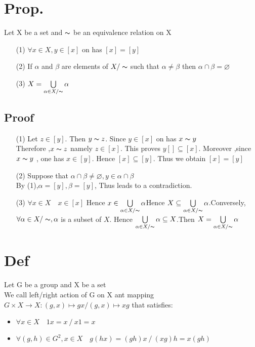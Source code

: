 \documentclass{book}
\begin{document}
\section{Prop.}
Let X be a set and $\thicksim$  be an equivalence relation on X
\begin{itemize}
    \item[(1)] $\forall x\in X,y\in [x]$ on has $[x]=[y]$
    \item[(2)] If $\alpha$ and $\beta$ are elements of $X/\thicksim $ such that $\alpha\not=\beta$ then $\alpha\cap\beta =\varnothing$
    \item[(3)] $X=\bigcup\limits_{\alpha\in X/\thicksim }\alpha$
\end{itemize}
\subsection{Proof}
\begin{itemize}
    \item[(1)] Let $z\in [y]$. Then $y\thicksim z$. Since $y\in [x]$ on has $x\thicksim y$\\Therefore ,$x\thicksim z$ namely $z\in [x]$. This proves $y[]\subseteq [x]$. Moreover ,since $x\thicksim y$ , one has $x\in [y]$. Hence $[x]\subseteq[y]$. Thus we obtain $[x]=[y]$
    \item[(2)] Suppose that $\alpha\cap\beta\not=\varnothing,y\in \alpha\cap\beta$\\By (1),$\alpha=[y],\beta=[y]$, Thus leads to a contradiction.
    \item[(3)] $\forall x\in X\quad x\in [x]$ Hence $x\in \bigcup\limits_{\alpha\in X/\thicksim }\alpha$Hence $X\subseteq\bigcup\limits_{\alpha\in X/\thicksim }\alpha$.Conversely, $\forall \alpha\in X/\thicksim ,\alpha$ is a subset of $X$. Hence $\bigcup\limits_{\alpha\in X/\thicksim }\alpha\subseteq X$.Then $X=\bigcup\limits_{\alpha\in X/\thicksim }\alpha$
\end{itemize}
\section{Def}
Let G be a group and X be a set \\
We call left/right action of G on X ant mapping $G\times X\rightarrow X:(g,x)\mapsto gx/(g,x)\mapsto xg$ that satisfies:
\begin{itemize}
    \item $\forall x\in X\quad 1x=x\ /\ x1=x$
    \item $\forall(g,h)\in G^2,x\in X\quad g(hx)=(gh)x\ /\ (xg)h=x(gh)$
\end{itemize}
\end{document}
